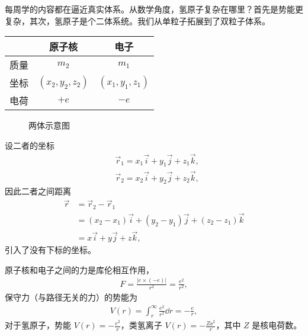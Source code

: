 每周学的内容都在逼近真实体系。从数学角度，氢原子复杂在哪里？首先是势能更复杂，其次，氢原子是个二体系统。我们从单粒子拓展到了双粒子体系。
\begin{table}[ht]
\centering
\begin{tabular}[t]{lcc}
\toprule
&原子核 & 电子 \\
\midrule
质量 & $m_2$ & $m_1$ \\
坐标 & $(x_2,y_2,z_2)$ & $(x_1,y_1,z_1)$\\
电荷 & $+e$ & $-e$ \\
\bottomrule
\end{tabular}
\end{table}%

\begin{figure}[tp]\centering
    \caption{两体示意图}
    \end{figure}
设二者的坐标
\begin{align}
    &\vec r_1 = x_1 \vec i + y_1 \vec j + z_1 \vec k, \\
    &\vec r_2 = x_2 \vec i + y_2 \vec j + z_2 \vec k,
\end{align}
因此二者之间距离
\begin{align}
    \vec r &= \vec r_2 - \vec r_1 \\
    &= (x_2 - x_1) \vec i + (y_2 - y_1) \vec j + (z_2 - z_1) \vec k\\
    &=x \vec i + y \vec j + z \vec k,
\end{align}
引入了没有下标的坐标。

原子核和电子之间的力是库伦相互作用，
\begin{align}
    F = \frac{|e\times(-e)|}{r^2} = \frac{e^2}{r^2},
\end{align}
保守力（与路径无关的力）的势能为
\begin{align}
    V(r) = \int_r ^\infty \frac{e^2}{r^2} \dd r = - \frac{e}{r},
\end{align}
对于氢原子，势能 $V(r) = -\frac{e^2}{r}$，类氢离子 $V(r) = - \frac{Z \ee^2}{r}$，其中 $Z$ 是核电荷数。

